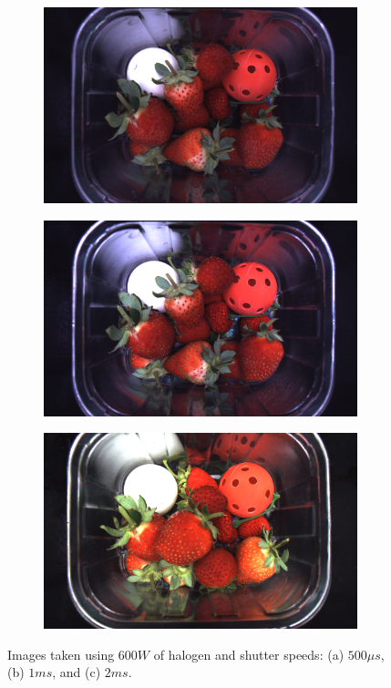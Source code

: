 \documentclass[fleqn,twoside,12pt]{report}
\begin{document}
\begin{figure}[h]
	\centering
	\begin{subfigure}{0.32\textwidth}
		\centering
		\includegraphics[width=\linewidth]{500us.png}
		\caption{}
		\label{fig:500us}
	\end{subfigure}%
	\begin{subfigure}{.32\textwidth}
		\centering
		\includegraphics[width=\linewidth]{1ms.png}
		\caption{}
		\label{fig:1ms}
	\end{subfigure}%
	\begin{subfigure}{.32\textwidth}
		\centering
		\includegraphics[width=\linewidth]{2ms.png}
		\caption{}
		\label{fig:2ms}
	\end{subfigure}%
	\caption{Images taken using $600W$ of halogen and shutter speeds: (a) $500\mu s$, (b) $1ms$, and (c) $2ms$.}
	\label{}
\end{figure} 
\end{document}
